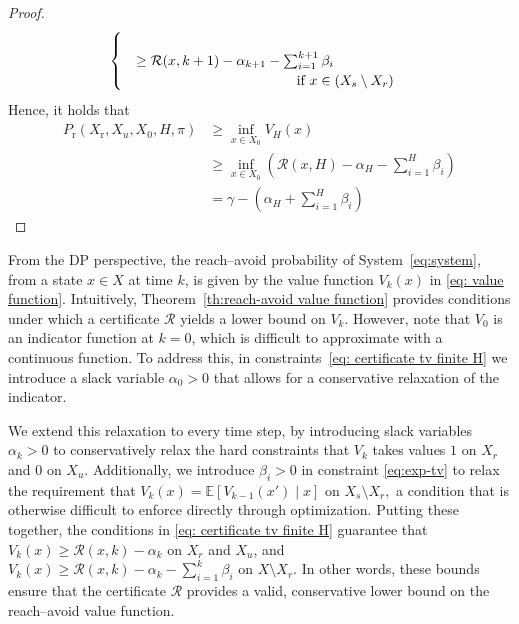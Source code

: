 \documentclass[journal,twoside,web]{ieeecolor}
\newcommand{\reach}{\mathrm{r}}
\newcommand{\hor}{H}
\newcommand{\RA}{\mathcal{R}}
\newcommand{\Pfin}{P_{\reach}(X_{\reach}, X_u, X_0, \hor, \pi)}
\theoremstyle{definition}
\theoremstyle{plain}
\theoremstyle{plain}
\begin{document}
\begin{proof}
\begin{align*}
\begin{cases}
            \\
           \quad \geq \RA(x,k+1) - \alpha_{k+1} - \sum_{i=1}^{k+1} \beta_i  \\\hspace{44mm} \text{if } x \in (X_s \setminus X_r)
        \end{cases}
    \end{align*}    
    Hence, it holds that
    \begin{align*}
       \Pfin & \geq \inf_{x \in X_0} V_H(x) \\
        & \geq \inf_{x \in X_0} \left(\RA(x,\hor) - \alpha_\hor - \sum_{i=1}^{\hor} \beta_i \right) \\
        & = \gamma - \left(\alpha_\hor + \sum_{i=1}^{\hor} \beta_i \right)
    \end{align*}
\end{proof}

From the DP perspective, the reach–avoid probability of System~\eqref{eq:system}, from a state $x \in X$ at time $k$, is given by the value function $V_k(x)$ in \eqref{eq: value function}. Intuitively, Theorem~\ref{th:reach-avoid value function} provides conditions under which a certificate $\RA$ yields a lower bound on $V_k$. However, note that $V_0$ is an indicator function at $k=0$, which is difficult to approximate with a continuous function. To address this, 
in constraints~\eqref{eq: certificate tv finite H}
we introduce a slack variable $\alpha_0 > 0$ that allows for a conservative relaxation of the indicator.

We extend this relaxation to every time step, by introducing slack variables $\alpha_k > 0$ to conservatively relax the hard constraints that $V_k$ takes values $1$ on $X_r$ and $0$ on $X_u$. Additionally, we introduce $\beta_i > 0$ in constraint \eqref{eq:exp-tv} to relax the requirement that $V_k(x) = \mathbb{E}[V_{k-1}(x') \mid x]$ on $X_s \setminus X_r,$
a condition that is otherwise difficult to enforce directly through optimization.
% 
Putting these together, the conditions in \eqref{eq: certificate tv finite H} guarantee that $V_k(x) \ge \RA(x,k) - \alpha_k$ on $X_r$ and $X_u$, and
$V_k(x) \ge \RA(x,k) - \alpha_k - \sum_{i=1}^k \beta_i$ on $X \setminus X_r$.
In other words, these bounds ensure that the certificate $\RA$ provides a valid, conservative lower bound on the reach–avoid value function.



\end{document}
